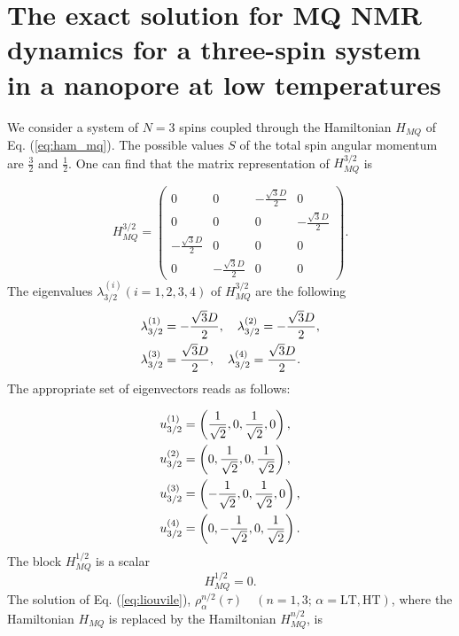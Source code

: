 \section{The exact solution for MQ NMR dynamics for a three-spin system in a nanopore at low temperatures}
\label{sec:exact_sol}

We consider a system of $N=3$ spins coupled through the Hamiltonian $H_{MQ}$ of Eq.   (\ref{eq:ham_mq}). The possible values $S$ of the total spin angular momentum are $\frac 3 2$ and $\frac 1 2$. One can find that the matrix representation of $H_{MQ}^{3/2}$  is 

\begin{equation}
    \label{eq:ham_3_2}
    H_{MQ}^{3/2} = 
    \begin{pmatrix}
        0 & 0 & -\frac{\sqrt{3} D}{2} & 0 \\
        0 & 0 & 0 & -\frac{\sqrt{3} D}{2} \\
        -\frac{\sqrt{3} D}{2} & 0 & 0 & 0 \\
        0 & -\frac{\sqrt{3} D}{2} & 0 & 0 
    \end{pmatrix}.
\end{equation}
The eigenvalues $\lambda_{3/2}^{(i)}(i=1, 2, 3, 4)$ of  $H_{MQ}^{3/2}$ are the following 
\begin{align}
    \label{eq:eigvals_3_2}
    \lambda_{3/2}^{(1)} &= -\frac{\sqrt{3} D}{2}, \quad
    \lambda_{3/2}^{(2)} = -\frac{\sqrt{3} D}{2}, \notag \\
    \lambda_{3/2}^{(3)} &= \frac{\sqrt{3} D}{2}, \quad
    \lambda_{3/2}^{(4)} = \frac{\sqrt{3} D}{2}.
\end{align}
The appropriate set of eigenvectors reads as follows:

\begin{align}
    \label{eq:eigvecs_3_2}
    u_{3/2}^{(1)} & =  \left(\frac{1}{\sqrt{2}}, 0, 
                   \frac{1}{\sqrt{2}}, 0\right) ,
    \notag \\
    u_{3/2}^{(2)} & =  \left(0, \frac{1}{\sqrt{2}}, 
                   0, \frac{1}{\sqrt{2}}\right) ,
    \notag \\
    u_{3/2}^{(3)} & =  \left(-\frac{1}{\sqrt{2}}, 0, 
                   \frac{1}{\sqrt{2}}, 0\right) ,
    \notag \\               
    u_{3/2}^{(4)} & =  \left(0, -\frac{1}{\sqrt{2}}, 
                   0, \frac{1}{\sqrt{2}}\right)  .              
\end{align}
The block $H^{1/2}_{MQ}$ is a scalar
\begin{equation}
    \label{eq:ham_1_2}
    H^{1/2}_{MQ} = 0.
\end{equation}
The solution of Eq.   (\ref{eq:liouvile}), $\rho_{\alpha}^{n/2} (\tau) \quad (n = 1, 3; \, \alpha = \mathrm{LT}, \mathrm{HT})$, where the Hamiltonian $H_{MQ}$ is replaced by the Hamiltonian $H_{MQ}^{n/2}$, is 

